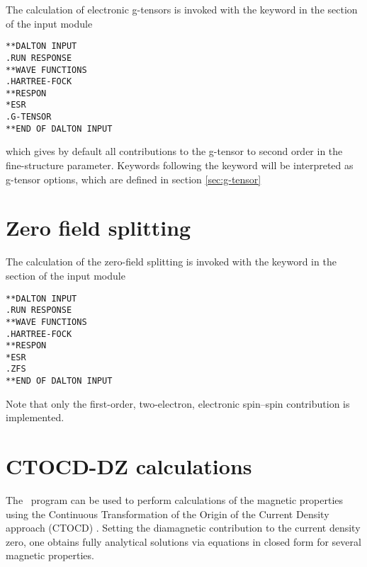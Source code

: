 The calculation of electronic g-tensors is invoked
with the keyword  in the
 section of the  input module

\begin{verbatim}
**DALTON INPUT
.RUN RESPONSE
**WAVE FUNCTIONS
.HARTREE-FOCK
**RESPON
*ESR
.G-TENSOR
**END OF DALTON INPUT
\end{verbatim}
which gives by default all contributions to the g-tensor to second order in
the fine-structure parameter. Keywords following the  keyword
will be interpreted as g-tensor options, which are defined in section
\ref{sec:g-tensor}

\section{Zero field splitting}

\begin{center}
\end{center}
The calculation of the zero-field splitting is invoked
with the keyword  in the
 section of the  input module
\begin{verbatim}
**DALTON INPUT
.RUN RESPONSE
**WAVE FUNCTIONS
.HARTREE-FOCK
**RESPON
*ESR
.ZFS
**END OF DALTON INPUT
\end{verbatim}
Note that only the first-order, two-electron, electronic spin--spin contribution
is implemented.

\section{CTOCD-DZ calculations}\label{sec:ctocd}

The \dalton\ program can be used to perform calculations of the magnetic
properties using the Continuous Transformation of the Origin of the Current Density
approach (CTOCD) . Setting the diamagnetic contribution
to the current density zero, one obtains fully analytical solutions via equations
in closed form for several magnetic properties.


